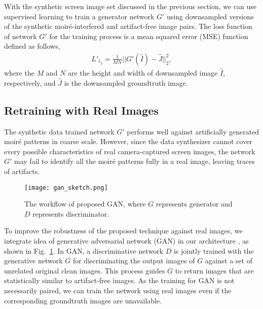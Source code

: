 \documentclass[10pt,twocolumn,letterpaper]{article}
\begin{document}
With the synthetic screen image set discussed in the previous section,
we can use supervised learning to train a generator network $G'$ using
downsampled versions of the synthetic moir\'e-interfered and
artifact-free image pairs.  The loss function of network $G'$ for the
training process is a mean squared error (MSE) function defined as
follows,
\begin{align}
  L'_{\ell_2} = \frac{1}{MN}||G'(\hat{I}) - \hat{J}||_2^2,
\end{align}
where the $M$ and $N$ are the height and width of downsampled image
$\hat{I}$, respectively, and $\hat{J}$ is the downsampled groundtruth
image.

\subsection{Retraining with Real Images}

The synthetic data trained network $G'$ performs well against
artificially generated moir\'e patterns in coarse scale.  However,
since the data synthesizer cannot cover every possible characteristics
of real camera-captured screen images, the network $G'$ may fail to
identify all the moir\'e patterns fully in a real image, leaving
traces of artifacts.

\begin{figure}
  \centering
  \texttt{[image: gan\_sketch.png]}
  \caption{The workflow of proposed GAN, where $G$ represents
    generator and $D$ represents discriminator.}
  \label{fig:gan_sketch}
\end{figure}

To improve the robustness of the proposed technique against real
images, we integrate idea of generative adversarial network (GAN) in
our architecture \cite{goodfellow2014generative}, as shown in
Fig.~\ref{fig:gan_sketch}.  In GAN, a discriminative network $D$ is
jointly trained with the generative network $G$ for discriminating the
output images of $G$ against a set of unrelated original clean images.
This process guides $G$ to return images that are statistically
similar to artifact-free images.  As the training for GAN is not
necessarily paired, we can train the network using real images even if
the corresponding groundtruth images are unavailable.
\end{document}
